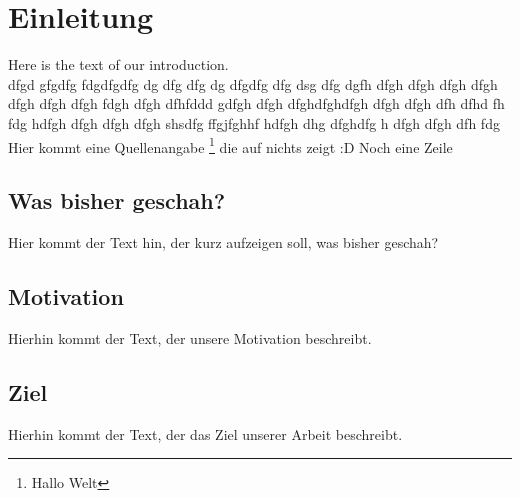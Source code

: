 \section{Einleitung}
Here is the text of our introduction. \\
dfgd gfgdfg fdgdfgdfg dg dfg dfg dg dfgdfg dfg dsg dfg dgfh dfgh dfgh dfgh dfgh dfgh dfgh dfgh fdgh dfgh dfhfddd gdfgh dfgh dfghdfghdfgh dfgh dfgh dfh dfhd fh fdg hdfgh dfgh dfgh dfgh shsdfg ffgjfghhf hdfgh dhg dfghdfg h dfgh dfgh dfh fdg \\
Hier kommt eine Quellenangabe \footnote[1]{Hallo Welt} die auf nichts zeigt :D
Noch eine Zeile
\subsection{Was bisher geschah?}
Hier kommt der Text hin, der kurz aufzeigen soll, was bisher geschah?
\subsection{Motivation}
Hierhin kommt der Text, der unsere Motivation beschreibt.
\subsection{Ziel}
Hierhin kommt der Text, der das Ziel unserer Arbeit beschreibt.
